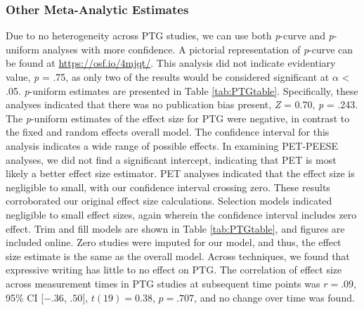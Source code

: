 \documentclass[english,man, mask]{apa6}
\theoremstyle{definition}
\theoremstyle{definition}
\theoremstyle{definition}
\theoremstyle{remark}
\begin{document}
\subsubsection{Other Meta-Analytic
Estimates}\label{other-meta-analytic-estimates-1}

Due to no heterogeneity across PTG studies, we can use both
\emph{p}-curve and \emph{p}-uniform analyses with more confidence. A
pictorial representation of \emph{p}-curve can be found at
\url{https://osf.io/4mjqt/}. This analysis did not indicate evidentiary
value, \emph{p} = .75, as only two of the results would be considered
significant at \(\alpha\) \textless{} .05. \emph{p}-uniform estimates
are presented in Table \ref{tab:PTGtable}. Specifically, these analyses
indicated that there was no publication bias present, \emph{Z} = 0.70,
\emph{p} = .243. The \emph{p}-uniform estimates of the effect size for
PTG were negative, in contrast to the fixed and random effects overall
model. The confidence interval for this analysis indicates a wide range
of possible effects. In examining PET-PEESE analyses, we did not find a
significant intercept, indicating that PET is most likely a better
effect size estimator. PET analyses indicated that the effect size is
negligible to small, with our confidence interval crossing zero. These
results corroborated our original effect size calculations. Selection
models indicated negligible to small effect sizes, again wherein the
confidence interval includes zero effect. Trim and fill models are shown
in Table \ref{tab:PTGtable}, and figures are included online. Zero
studies were imputed for our model, and thus, the effect size estimate
is the same as the overall model. Across techniques, we found that
expressive writing has little to no effect on PTG. The correlation of
effect size across measurement times in PTG studies at subsequent time
points was \(r = .09\), 95\% CI \([-.36\), \(.50]\), \(t(19) = 0.38\),
\(p = .707\), and no change over time was found.
\end{document}
